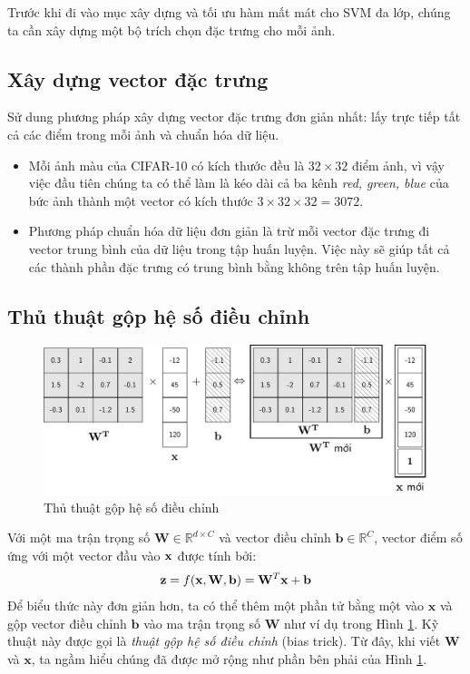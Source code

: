 Trước khi đi vào mục xây dựng và tối ưu hàm mất mát cho SVM đa lớp, chúng ta cần xây dựng một bộ trích chọn đặc trưng cho mỗi ảnh.

\subsection{Xây dựng vector đặc trưng}
Sử dung phương pháp xây dựng vector đặc trưng đơn giản nhất: lấy
trực tiếp tất cả các điểm trong mỗi ảnh và chuẩn hóa dữ liệu.
\begin{itemize}
\item Mỗi ảnh {màu} của CIFAR-10 có kích thước đều là $32
\times 32$ điểm ảnh, vì vậy việc đầu tiên chúng ta có thể làm là {kéo dài} cả ba kênh \textit{red, green, blue} của bức ảnh thành một vector có kích thước $3 \times 32 \times 32 = 3072$.

\item Phương pháp chuẩn hóa dữ liệu đơn giản là trừ mỗi vector đặc trưng đi vector trung bình của dữ liệu trong tập huấn luyện. Việc này sẽ giúp tất cả các thành phần đặc trưng có trung bình bằng không trên tập huấn luyện.

\end{itemize}

\subsection{Thủ thuật gộp hệ số điều chỉnh}
\begin{figure}[ht]
\centering
\includegraphics[width = \textwidth]{Chapters/09_SupportVectorMachines/22_multiclasssvm/latex/biastrick.pdf}
\caption[]{Thủ thuật gộp hệ số điều chỉnh}
\label{fig:22_3}
\end{figure}

Với một ma trận trọng số $\mathbf{W} \in \mathbb{R}^{d\times C}$ và vector điều chỉnh $\mathbf{b} \in \mathbb{R}^C$, vector điểm số ứng với một vector đầu vào $\mathbf{x}$ được tính bởi:
\begin{equation}
\mathbf{z} = f(\mathbf{x}, \mathbf{W}, \mathbf{b}) = \mathbf{W}^T\mathbf{x} + \mathbf{b}
\end{equation}
Để biểu thức này đơn giản hơn, ta có thể thêm một phần tử bằng một vào $\mathbf{x}$ và {gộp} vector điều chỉnh $\mathbf{b}$ vào ma trận trọng số $\mathbf{W}$
như ví dụ trong Hình \ref{fig:22_3}. Kỹ thuật này được gọi là \textit{thuật gộp hệ số điều chỉnh} (bias trick). Từ đây, khi viết
$\mathbf{W}$ và $\mathbf{x}$, ta ngầm hiểu chúng đã được mở rộng như
phần bên phải của Hình \ref{fig:22_3}.

